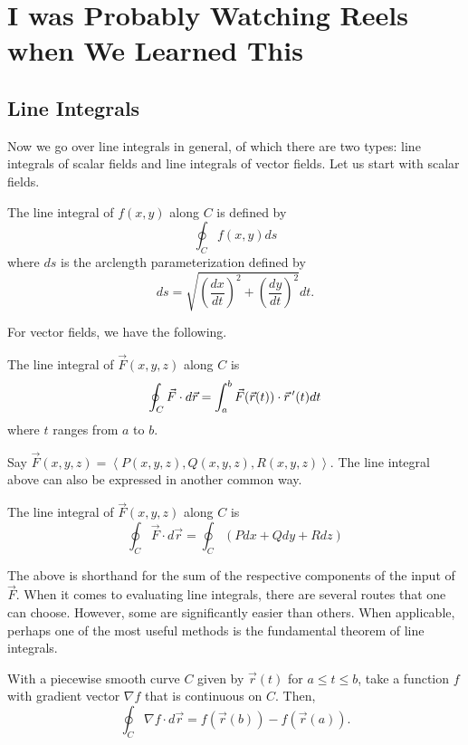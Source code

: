\chapter{I was Probably Watching Reels when We Learned This}

\section{Line Integrals}

Now we go over line integrals in general, of which there are two types: line integrals of scalar fields and line integrals of vector fields. Let us start with scalar fields.

\begin{definition}
    The line integral of $f(x, y)$ along $C$ is defined by
    \[\oint_{C}f(x, y)ds\]
    where $ds$ is the arclength parameterization defined by
    \[ds = \sqrt{\left(\frac{dx}{dt}\right)^{2} + \left(\frac{dy}{dt}\right)^{2}}dt.\]
\end{definition}

For vector fields, we have the following.

\begin{definition}
    The line integral of $\vec{F}(x, y, z)$ along $C$ is
    \[\oint_{C}\vec{F} \cdot d\vec{r} = \int_{a}^{b}\vec{F}(\vec{r}(t)) \cdot \vec{r}\,^{\prime}(t)dt\]
    where $t$ ranges from $a$ to $b$.
\end{definition}

Say $\vec{F}(x, y, z) = \left<P(x, y, z), Q(x, y, z), R(x, y, z)\right>$. The line integral above can also be expressed in another common way.

\begin{corollary}
    The line integral of $\vec{F}(x, y, z)$ along $C$ is
    \[\oint_{C}\vec{F} \cdot d\vec{r} = \oint_{C}\left(Pdx + Qdy + Rdz\right)\]
\end{corollary}

The above is shorthand for the sum of the respective components of the input of $\vec{F}$. When it comes to evaluating line integrals, there are several routes that one can choose. However, some are significantly easier than others. When applicable, perhaps one of the most useful methods is the fundamental theorem of line integrals.

\begin{theorem}
    With a piecewise smooth curve $C$ given by $\vec{r}(t)$ for $a \leq t \leq b$, take a function $f$ with gradient vector $\nabla f$ that is continuous on $C$. Then,
    \[\oint_{C}\nabla f \cdot d\vec{r} = f(\vec{r}(b)) - f(\vec{r}(a)).\]
\end{theorem}

